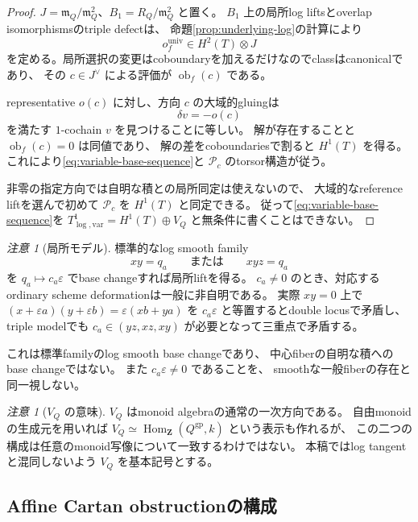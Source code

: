 \documentclass[uplatex,dvipdfmx,11pt]{jsarticle}
\numberwithin{equation}{section}
\theoremstyle{plain}
\theoremstyle{definition}
\theoremstyle{remark}
\newtheorem{remark}[theorem]{注意}
\DeclareMathOperator{\Hom}{Hom}
\DeclareMathOperator{\obf}{ob}
\newcommand{\ZZ}{\mathbf Z}
\begin{document}
\begin{proof}
\(J=\mathfrak m_Q/\mathfrak m_Q^2\)、\(B_1=R_Q/\mathfrak m_Q^2\) と置く。
\(B_1\) 上の局所log liftsとoverlap isomorphismsのtriple defectは、
命題\ref{prop:underlying-log}の計算により
\[
o_f^{\mathrm{univ}}\in H^2(T)\otimes J
\]
を定める。局所選択の変更はcoboundaryを加えるだけなのでclassはcanonicalであり、
その \(c\in J^\vee\) による評価が \(\obf_f(c)\) である。

representative \(o(c)\) に対し、方向 \(c\) の大域的gluingは
\[
\delta v=-o(c)
\]
を満たす \(1\)-cochain \(v\) を見つけることに等しい。
解が存在することと \(\obf_f(c)=0\) は同値であり、
解の差をcoboundariesで割ると \(H^1(T)\) を得る。
これにより\eqref{eq:variable-base-sequence}と
\(\mathcal P_c\) のtorsor構造が従う。

非零の指定方向では自明な積との局所同定は使えないので、
大域的なreference liftを選んで初めて \(\mathcal P_c\) を \(H^1(T)\) と同定できる。
従って\eqref{eq:variable-base-sequence}を
\(T^1_{\log,\mathrm{var}}=H^1(T)\oplus V_Q\) と無条件に書くことはできない。
\end{proof}

\begin{remark}[局所モデル]
\label{rem:local-model}
標準的なlog smooth family
\[
xy=q_a\qquad\text{または}\qquad xyz=q_a
\]
を \(q_a\mapsto c_a\varepsilon\) でbase changeすれば局所liftを得る。
\(c_a\ne0\) のとき、対応するordinary scheme deformationは一般に非自明である。
実際 \(xy=0\) 上で \((x+\varepsilon a)(y+\varepsilon b)=\varepsilon(xb+ya)\) を
\(c_a\varepsilon\) と等置するとdouble locusで矛盾し、
triple modelでも \(c_a\in(yz,xz,xy)\) が必要となって三重点で矛盾する。

これは標準familyのlog smooth base changeであり、
中心fiberの自明な積へのbase changeではない。
また \(c_a\varepsilon\ne0\) であることを、
smoothな一般fiberの存在と同一視しない。
\end{remark}

\begin{remark}[\(V_Q\) の意味]
\label{rem:VQ}
\(V_Q\) はmonoid algebraの通常の一次方向である。
自由monoidの生成元を用いれば
\(V_Q\simeq\Hom_{\ZZ}(Q^{\mathrm{gp}},k)\) という表示も作れるが、
この二つの構成は任意のmonoid写像について一致するわけではない。
本稿ではlog tangentと混同しないよう \(V_Q\) を基本記号とする。
\end{remark}

\subsection{Affine Cartan obstructionの構成}
\end{document}
